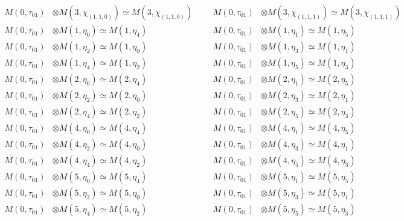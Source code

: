 \begin{align*}
M(0,\tau_{01}) &\otimes M(3,\chi_{(1,1,0)}) \simeq M(3,\chi_{(1,1,0)}) &&& M(0,\tau_{01}) &\otimes M(3,\chi_{(1,1,1)}) \simeq M(3,\chi_{(1,1,1)})\\
M(0,\tau_{01}) &\otimes M(1,\eta_{0}) \simeq M(1,\eta_{4}) &&& M(0,\tau_{01}) &\otimes M(1,\eta_{1}) \simeq M(1,\eta_{5})\\
M(0,\tau_{01}) &\otimes M(1,\eta_{2}) \simeq M(1,\eta_{0}) &&& M(0,\tau_{01}) &\otimes M(1,\eta_{3}) \simeq M(1,\eta_{1})\\
M(0,\tau_{01}) &\otimes M(1,\eta_{4}) \simeq M(1,\eta_{2}) &&& M(0,\tau_{01}) &\otimes M(1,\eta_{5}) \simeq M(1,\eta_{3})\\
M(0,\tau_{01}) &\otimes M(2,\eta_{0}) \simeq M(2,\eta_{4}) &&& M(0,\tau_{01}) &\otimes M(2,\eta_{1}) \simeq M(2,\eta_{5})\\
M(0,\tau_{01}) &\otimes M(2,\eta_{2}) \simeq M(2,\eta_{0}) &&& M(0,\tau_{01}) &\otimes M(2,\eta_{3}) \simeq M(2,\eta_{1})\\
M(0,\tau_{01}) &\otimes M(2,\eta_{4}) \simeq M(2,\eta_{2}) &&& M(0,\tau_{01}) &\otimes M(2,\eta_{5}) \simeq M(2,\eta_{3})\\
M(0,\tau_{01}) &\otimes M(4,\eta_{0}) \simeq M(4,\eta_{4}) &&& M(0,\tau_{01}) &\otimes M(4,\eta_{1}) \simeq M(4,\eta_{5})\\
M(0,\tau_{01}) &\otimes M(4,\eta_{2}) \simeq M(4,\eta_{0}) &&& M(0,\tau_{01}) &\otimes M(4,\eta_{3}) \simeq M(4,\eta_{1})\\
M(0,\tau_{01}) &\otimes M(4,\eta_{4}) \simeq M(4,\eta_{2}) &&& M(0,\tau_{01}) &\otimes M(4,\eta_{5}) \simeq M(4,\eta_{3})\\
M(0,\tau_{01}) &\otimes M(5,\eta_{0}) \simeq M(5,\eta_{4}) &&& M(0,\tau_{01}) &\otimes M(5,\eta_{1}) \simeq M(5,\eta_{5})\\
M(0,\tau_{01}) &\otimes M(5,\eta_{2}) \simeq M(5,\eta_{0}) &&& M(0,\tau_{01}) &\otimes M(5,\eta_{3}) \simeq M(5,\eta_{1})\\
M(0,\tau_{01}) &\otimes M(5,\eta_{4}) \simeq M(5,\eta_{2}) &&& M(0,\tau_{01}) &\otimes M(5,\eta_{5}) \simeq M(5,\eta_{3})\\
\end{align*}

